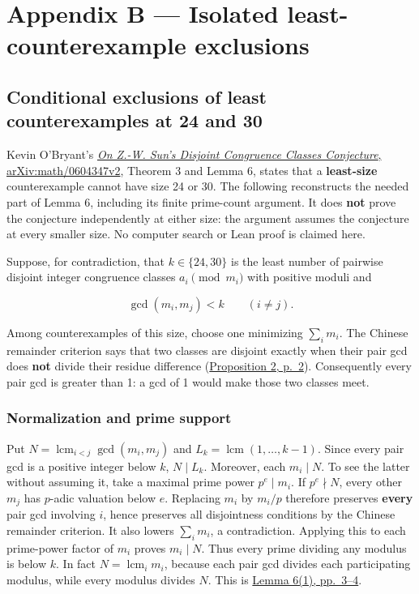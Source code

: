 \documentclass[11pt,a4paper]{article}
\begin{document}
\section{Appendix B --- Isolated least-counterexample exclusions}\label{appendix-b-isolated-least-counterexample-exclusions}

\subsection{Conditional exclusions of least counterexamples at 24 and 30}\label{conditional-exclusions-of-least-counterexamples-at-24-and-30}

Kevin O'Bryant's \href{https://arxiv.org/pdf/math/0604347v2}{\emph{On Z.-W. Sun's Disjoint Congruence Classes Conjecture}, arXiv:math/0604347v2}, Theorem 3 and Lemma 6, states that a \textbf{least-size} counterexample cannot have size 24 or 30. The following reconstructs the needed part of Lemma 6, including its finite prime-count argument. It does \textbf{not} prove the conjecture independently at either size: the argument assumes the conjecture at every smaller size. No computer search or Lean proof is claimed here.

Suppose, for contradiction, that \(k\in\{24,30\}\) is the least number of pairwise disjoint integer congruence classes \(a_i\pmod{m_i}\) with positive moduli and

\[
  \gcd(m_i,m_j)<k\qquad(i\ne j).
\]

Among counterexamples of this size, choose one minimizing \(\sum_i m_i\). The Chinese remainder criterion says that two classes are disjoint exactly when their pair gcd does \textbf{not} divide their residue difference (\href{https://arxiv.org/pdf/math/0604347v2}{Proposition 2, p.~2}). Consequently every pair gcd is greater than 1: a gcd of 1 would make those two classes meet.

\subsubsection{Normalization and prime support}\label{normalization-and-prime-support}

Put \(N=\operatorname{lcm}_{i<j}\gcd(m_i,m_j)\) and \(L_k=\operatorname{lcm}(1,\ldots,k-1)\). Since every pair gcd is a positive integer below \(k\), \(N\mid L_k\). Moreover, each \(m_i\mid N\). To see the latter without assuming it, take a maximal prime power \(p^e\mid m_i\). If \(p^e\nmid N\), every other \(m_j\) has \(p\)-adic valuation below \(e\). Replacing \(m_i\) by \(m_i/p\) therefore preserves \textbf{every} pair gcd involving \(i\), hence preserves all disjointness conditions by the Chinese remainder criterion. It also lowers \(\sum_i m_i\), a contradiction. Applying this to each prime-power factor of \(m_i\) proves \(m_i\mid N\). Thus every prime dividing any modulus is below \(k\). In fact \(N=\operatorname{lcm}_i m_i\), because each pair gcd divides each participating modulus, while every modulus divides \(N\). This is \href{https://arxiv.org/pdf/math/0604347v2}{Lemma 6(1), pp.~3--4}.
\end{document}
